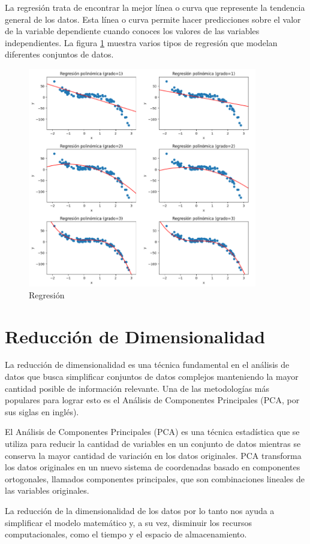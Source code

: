 La regresión trata de encontrar la mejor línea o curva que represente la tendencia 
general de los datos. Esta línea o curva permite hacer predicciones sobre el valor de la 
variable dependiente cuando conoces los valores de las variables independientes. 
La figura \ref{fig:Reg1}  muestra varios tipos de regresión que modelan 
diferentes conjuntos de datos.\medskip



\begin{figure}[H]
    \centering
       \includegraphics[width=10cm]{Imagenes/Regresion1.PNG}
      \caption{Regresión}
      \label{fig:Reg1}
\end{figure}



\section{Reducción de Dimensionalidad}

La reducción de dimensionalidad es una técnica fundamental en el análisis de datos que busca 
simplificar conjuntos de datos complejos manteniendo la mayor cantidad posible de información 
relevante. Una de las metodologías más populares para lograr esto es el 
Análisis de Componentes Principales (PCA, por sus siglas en inglés). \medskip

El Análisis de Componentes Principales (PCA) es una técnica estadística que se utiliza para 
reducir la cantidad de variables en un conjunto de datos mientras se conserva la mayor 
cantidad de variación en los datos originales. PCA transforma los datos originales en un 
nuevo sistema de coordenadas basado en componentes ortogonales, llamados componentes principales,
que son combinaciones lineales de las variables originales. \medskip

La reducción de  la dimensionalidad de los datos por lo tanto nos ayuda a 
simplificar el modelo matemático y, a su vez, disminuir los recursos computacionales, como 
el tiempo y el espacio de almacenamiento.\medskip



